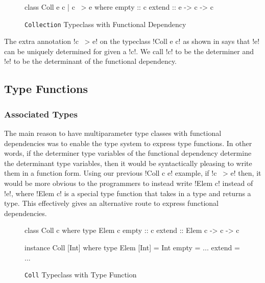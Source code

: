 \documentclass[manuscript,screen,nonacm]{acmart}
\begin{document}
\begin{figure}[ht]
  \begin{center}
    \begin{code}
      class Coll e c | c ~> e where
          empty :: c
          extend :: e -> c -> c
    \end{code}
  \end{center}
  \caption[Collection typeclass]{\lstinline{Collection} Typeclass with Functional Dependency}
  \label{fig:tc-collection-fd}
\end{figure}

The extra annotation !c ~> e! on the typeclass !Coll e c! as shown in  says that !e! can be uniquely determined for given a !c!.
We call !c! to be the determiner and !e! to be the determinant of the functional dependency.

%

\subsection{Type Functions}
\subsubsection{Associated Types}
The main reason to have multiparameter type classes with functional dependencies was to enable the type system to express type functions. In other words, if the determiner type variables of the functional dependency determine the determinant type variables, then it would be syntactically pleasing to write them in a function form.
Using our previous !Coll c e! example, if !c ~> e! then, it would be more obvious to the programmers to instead write !Elem c! instead of !e!, where !Elem c! is a special type function that takes in a type and returns a type. This effectively gives an alternative route to express functional dependencies.
\begin{figure}[ht]
  \begin{center}
    \begin{minipage}[ht]{0.4\linewidth}
      \begin{code}
        class Coll c where
           type Elem c
           empty :: c
           extend :: Elem c -> c -> c
      \end{code}
    \end{minipage}%
    \begin{minipage}[ht]{0.4\linewidth}
      \begin{code}
        instance Coll [Int] where
           type Elem [Int] = Int
           empty = ...
           extend = ...
      \end{code}
    \end{minipage}
  \end{center}
  \caption[Collection typeclass]{\lstinline{Coll} Typeclass with Type Function}
  \label{fig:type-fam}
\end{figure}
\end{document}
